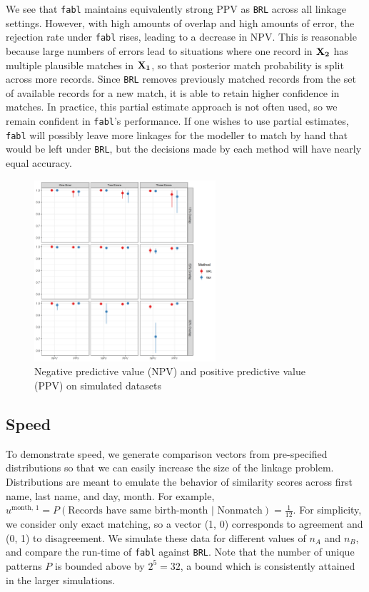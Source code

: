\documentclass[12pt,letterpaper]{article}
\newcommand{\1}[1]{\mathbb{I}\!\left[#1\right]} %
\begin{document}
We see that \texttt{fabl} maintains equivalently strong PPV as \texttt{BRL} across all linkage settings. However, with high amounts of overlap and high amounts of error, the rejection rate under \texttt{fabl} rises, leading to a decrease in NPV. This is reasonable because large numbers of errors lead to situations where one record in $\bf{X}_2$ has multiple plausible matches in $\bf{X}_1$, so that posterior match probability is split across more records. Since \texttt{BRL} removes previously matched records from the set of available records for a new match, it is able to retain higher confidence in matches. In practice, this partial estimate approach is not often used, so we remain confident in \texttt{fabl}'s performance. If one wishes to use partial estimates, \texttt{fabl} will possibly leave more linkages for the modeller to match by hand that would be left under \texttt{BRL}, but the decisions made by each method will have nearly equal accuracy. 

\begin{figure}[h!]
\begin{center}
	\includegraphics[width=0.6\textwidth]{../notes/figures/sadinle_sim_plot_partial} 
	\caption{Negative predictive value (NPV) and positive predictive value (PPV) on simulated datasets}
	\label{fig:sadinle_simulation_partial}
\end{center}
\end{figure}


\hypertarget{speed}{%
	\subsection{Speed}\label{speed}}


To demonstrate speed, we generate comparison vectors from pre-specified
distributions so that we can easily increase the size of the linkage
problem. Distributions are meant to emulate the behavior of similarity
scores across first name, last name, and day, month. For example, $u^{\text{month, 1}} = P(\text{Records have same birth-month | Nonmatch}) = \frac{1}{12}$. For simplicity, we
consider only exact matching, so a vector (1, 0) corresponds to
agreement and (0, 1) to disagreement. We simulate these data for
different values of \(n_A\) and \(n_B\), and compare the run-time of
\texttt{fabl} against \texttt{BRL}. Note that the number of unique
patterns \(P\) is bounded above by \(2^5 = 32\), a bound which is
consistently attained in the larger simulations.
\end{document}
